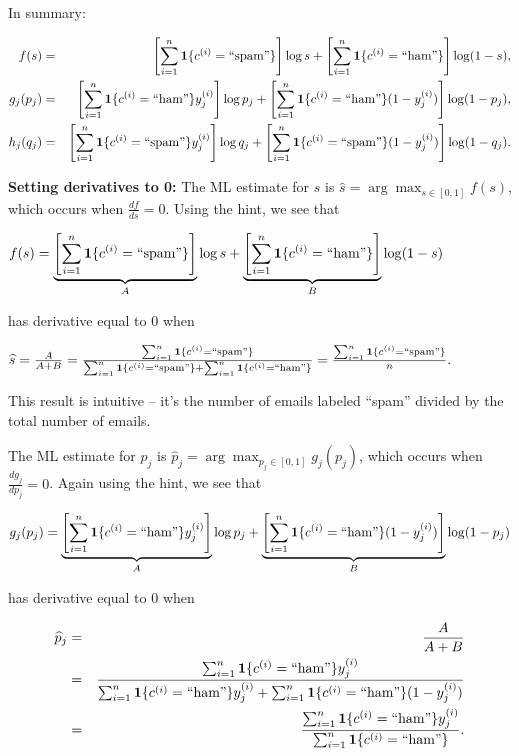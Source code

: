 In summary:

\begin{eqnarray*}
f(s) &=&\left[\sum_{i=1}^{n}\mathbf{1}\{c^{(i)}=``\text{spam}"\}\right]\log s+\left[\sum_{i=1}^{n}\mathbf{1}\{c^{(i)}=``\text{ham}"\}\right]\log(1-s),\\
g_{j}(p_{j}) &=&\left[\sum_{i=1}^{n}\mathbf{1}\{c^{(i)}=``\text{ham}"\}y_{j}^{(i)}\right]\log p_{j}+\left[\sum_{i=1}^{n}\mathbf{1}\{c^{(i)}=``\text{ham}"\}(1-y_{j}^{(i)})\right]\log(1-p_{j}),\\
h_{j}(q_{j}) &=&\left[\sum_{i=1}^{n}\mathbf{1}\{c^{(i)}=``\text{spam}"\}y_{j}^{(i)}\right]\log q_{j}+\left[\sum_{i=1}^{n}\mathbf{1}\{c^{(i)}=``\text{spam}"\}(1-y_{j}^{(i)})\right]\log(1-q_{j}).
\end{eqnarray*}

\textbf{Setting derivatives to 0:} The ML estimate for $s$ is $\widehat{s}=\arg \max _{s\in [0,1]}f(s)$, which occurs when $\frac{df}{ds}=0$. Using the hint, we see that

{\centering$f(s)=\underbrace{\left[\sum _{i=1}^{n}\mathbf{1}\{ c^{(i)}=``\text {spam}"\} \right]}_{A}\log s+\underbrace{\left[\sum _{i=1}^{n}\mathbf{1}\{ c^{(i)}=``\text {ham}"\} \right]}_{B}\log (1-s)$ \par}
 
has derivative equal to 0 when

{\centering$\widehat{s}=\frac{A}{A+B}=\frac{\sum _{i=1}^{n}\mathbf{1}\{ c^{(i)}=``\text {spam}"\} }{\sum _{i=1}^{n}\mathbf{1}\{ c^{(i)}=``\text {spam}"\} +\sum _{i=1}^{n}\mathbf{1}\{ c^{(i)}=``\text {ham}"\} }=\frac{\sum _{i=1}^{n}\mathbf{1}\{ c^{(i)}=``\text {spam}"\} }{n}.$ \par}
 
This result is intuitive -- it's the number of emails labeled ``spam'' divided by the total number of emails.

The ML estimate for $p_j$ is $\widehat{p}_{j}=\arg \max _{p_{j}\in [0,1]}g_{j}(p_{j})$, which occurs when $\frac{dg_{j}}{dp_{j}}=0$. Again using the hint, we see that

{\centering$g_{j}(p_{j})=\underbrace{\left[\sum _{i=1}^{n}\mathbf{1}\{ c^{(i)}=``\text {ham}"\} y_{j}^{(i)}\right]}_{A}\log p_{j}+\underbrace{\left[\sum _{i=1}^{n}\mathbf{1}\{ c^{(i)}=``\text {ham}"\} (1-y_{j}^{(i)})\right]}_{B}\log (1-p_{j})$ \par}
 
has derivative equal to 0 when

\begin{eqnarray*}
\widehat{p}_{j} & =&\frac{A}{A+B}\\
 & =&\frac{\sum_{i=1}^{n}\mathbf{1}\{c^{(i)}=``\text{ham}"\}y_{j}^{(i)}}{\sum_{i=1}^{n}\mathbf{1}\{c^{(i)}=``\text{ham}"\}y_{j}^{(i)}+\sum_{i=1}^{n}\mathbf{1}\{c^{(i)}=``\text{ham}"\}(1-y_{j}^{(i)})}\\
 & =&\frac{\sum_{i=1}^{n}\mathbf{1}\{c^{(i)}=``\text{ham}"\}y_{j}^{(i)}}{\sum_{i=1}^{n}\mathbf{1}\{c^{(i)}=``\text{ham}"\}}.
\end{eqnarray*}

